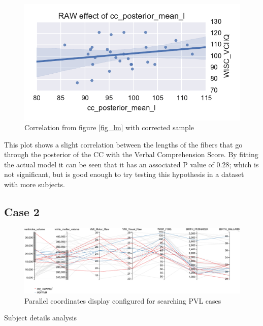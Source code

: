 \documentclass[twocolumn]{svjour3}
\begin{document}
\begin{figure}
\begin{center}
\includegraphics[width=\linewidth]{figures/cases/final_corr}
\end{center}
 \caption{\label{fig_lm2} Correlation from figure \ref{fig_lm} with corrected sample}
\end{figure}


This plot shows a slight correlation between the lengths of the fibers that go through the posterior of the CC with the Verbal Comprehension Score. By fitting the actual model it can be seen that it has an associated P value of 0.28; which is not significant, but is good enough to try testing this hypothesis in a dataset with more subjects.
  

\subsection{Case 2}

\begin{figure}
\begin{center}
\includegraphics[width=\linewidth]{figures/cases/parallel_coordinates}
\end{center}
 \caption{\label{fig_parallel}Parallel coordinates display configured for searching PVL cases}
\end{figure}

Subject details analysis
\end{document}
